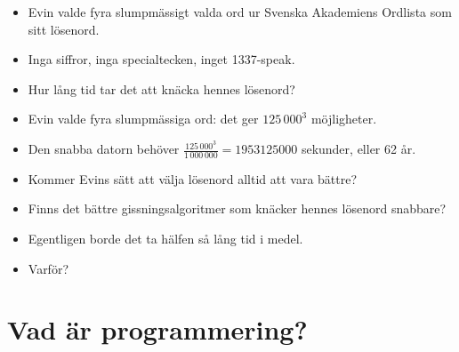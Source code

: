 \begin{frame}
  \begin{exercise}
    \begin{itemize}
      \item Evin valde fyra slumpmässigt valda ord ur Svenska Akademiens 
        Ordlista som sitt lösenord.
      \item Inga siffror, inga specialtecken, inget 1337-speak.
      \item Hur lång tid tar det att knäcka hennes lösenord?
    \end{itemize}
  \end{exercise}
\end{frame}

\begin{frame}
  \begin{solution}
    \begin{itemize}
      \item Evin valde fyra slumpmässiga ord: det ger \(125\,000^3\) 
        möjligheter.
      \item Den \alert{snabba} datorn behöver \(\frac{125\,000^3}{1\,000\,000} 
        = 1953125000\) sekunder, eller 62 år.
    \end{itemize}
  \end{solution}
\end{frame}

\begin{frame}
  \begin{question}
    \begin{itemize}
      \item Kommer Evins sätt att välja lösenord alltid att vara bättre?
      \item Finns det bättre gissningsalgoritmer som knäcker hennes lösenord 
        snabbare?
    \end{itemize}
  \end{question}
\end{frame}

\begin{frame}
  \begin{question}
    \begin{itemize}
      \item Egentligen borde det ta hälfen så lång tid i medel.
      \item Varför?
    \end{itemize}
  \end{question}
\end{frame}


\section{Vad är programmering?}


